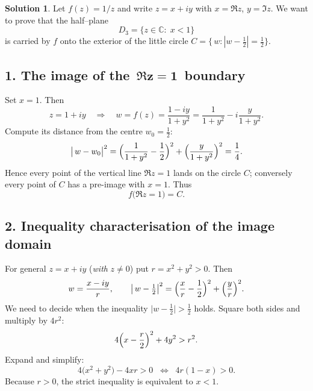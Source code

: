 \documentclass[12pt]{article}
\theoremstyle{definition} %
\newtheorem{solution}{Solution}
\theoremstyle{plain} %
\begin{document}
   \begin{solution}
      Let \(f(z)=1/z\) and write \(z=x+iy\) with \(x=\Re z\), \(y=\Im z\).  
      We want to prove that the half–plane
      \[
           D_{3}=\{z\in\mathbb{C}:\;x<1\}
      \]
      is carried by \(f\) onto the exterior of the little circle
      \(\displaystyle C=\bigl\{\,w:|w-\tfrac12|=\tfrac12\bigr\}\).
      
      \subsection*{1.  The image of the \(\boldsymbol{\,\Re z=1\,}\) boundary}
      
      Set \(x=1\).  Then
      \[
         z=1+iy
         \quad\Longrightarrow\quad
         w=f(z)=\frac{1-iy}{1+y^{2}}
              =\frac{1}{1+y^{2}}-i\frac{y}{1+y^{2}} .
      \]
      Compute its distance from the centre \(w_{0}=\tfrac12\):
      \[
        \bigl|\,w-w_{0}\bigr|^{2}
          =\Bigl(\frac{1}{1+y^{2}}-\frac12\Bigr)^{2}
           +\Bigl(\frac{y}{1+y^{2}}\Bigr)^{2}
          =\frac14 .
      \]
      Hence every point of the vertical line \(\Re z=1\) lands on the
      circle \(C\); conversely every point of \(C\) has a pre-image with
      \(x=1\).  Thus
      \[
         f\bigl(\Re z=1\bigr)=C.
      \]
      
      \subsection*{2.  Inequality characterisation of the image domain}
      
      For general \(z=x+iy\) (\emph{with} \(z\neq0\)) put
      \(r=x^{2}+y^{2}>0\).  Then
      \[
           w=\frac{x-iy}{r},
           \qquad
           \bigl|\,w-\tfrac12\bigr|^{2}
             =\Bigl(\frac{x}{r}-\frac12\Bigr)^{2}
              +\Bigl(\frac{y}{r}\Bigr)^{2}.
      \]
      We need to decide when the inequality
      \(\bigl|w-\tfrac12\bigr|>\tfrac12\) holds.  Square both sides and
      multiply by \(4r^{2}\):
      \[
         4\Bigl(x-\frac{r}{2}\Bigr)^{2} + 4y^{2} > r^{2}.
      \]
      Expand and simplify:
      \[
         4\bigl(x^{2}+y^{2}\bigr) - 4xr > 0
         \;\;\Longleftrightarrow\;\;
         4r(1-x) > 0.
      \]
      Because \(r>0\), the strict inequality is equivalent to
      \(\boxed{x<1}\).
      

\end{solution}
\end{document}
